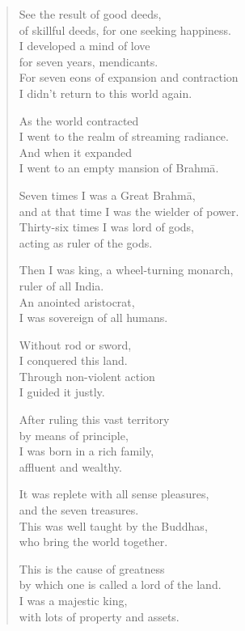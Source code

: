 \documentclass[12pt,openany]{book}%
\begin{document}
\begin{verse}%
See the result of good deeds, \\
of skillful deeds, for one seeking happiness. \\
I developed a mind of love \\
for seven years, mendicants. \\
For seven eons of expansion and contraction \\
I didn’t return to this world again. 

As the world contracted \\
I went to the realm of streaming radiance. \\
And when it expanded \\
I went to an empty mansion of \textsanskrit{Brahmā}. 

Seven times I was a Great \textsanskrit{Brahmā}, \\
and at that time I was the wielder of power. \\
Thirty-six times I was lord of gods, \\
acting as ruler of the gods. 

Then I was king, a wheel-turning monarch, \\
ruler of all India. \\
An anointed aristocrat, \\
I was sovereign of all humans. 

Without rod or sword, \\
I conquered this land. \\
Through non-violent action \\
I guided it justly. 

After ruling this vast territory \\
by means of principle, \\
I was born in a rich family, \\
affluent and wealthy. 

It was replete with all sense pleasures, \\
and the seven treasures. \\
This was well taught by the Buddhas, \\
who bring the world together. 

This is the cause of greatness \\
by which one is called a lord of the land. \\
I was a majestic king, \\
with lots of property and assets. 


\end{verse}
\end{document}
